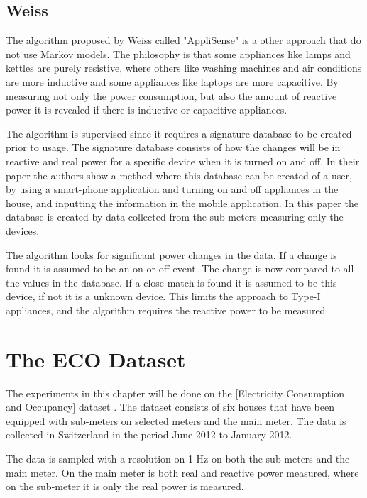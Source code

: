 \subsection{Weiss}
The algorithm proposed by Weiss called "AppliSense" is a other approach that do not use Markov models\citep{RefWorks:23}. The philosophy is that some appliances like lamps and kettles are purely resistive, where others like washing machines and air conditions are more inductive and some appliances like laptops are more capacitive. By measuring not only the power consumption, but also the amount of reactive power it is revealed if there is inductive or capacitive appliances.

The algorithm is supervised since it requires a signature database to be created prior to usage. The signature database consists of how the changes will be in reactive and real power for a specific device when it is turned on and off. In their paper the authors show a method where this database can be created of a user, by using a smart-phone application and turning on and off appliances in the house, and inputting the information in the mobile application\citep{RefWorks:23}. In this paper the database is created by data collected from the sub-meters measuring only the devices.  

The algorithm looks for significant power changes in the data. If a change is found it is assumed to be an on or off event. The change is now compared to all the values in the database. If a close match is found it is assumed to be this device, if not it is a unknown device. This limits the approach to Type-I appliances, and the algorithm requires the reactive power to be measured. 

\section{The ECO Dataset}
The experiments in this chapter will be done on the [Electricity Consumption and Occupancy] dataset \citep{RefWorks:26}\citep{RefWorks:27}. The dataset consists of six houses that have been equipped with sub-meters on selected meters and the main meter. The data is collected in Switzerland in the period June 2012 to January 2012. 

The data is sampled with a resolution on 1 Hz on both the sub-meters and the main meter. On the main meter is both real and reactive power measured, where on the sub-meter it is only the real power is measured. 

